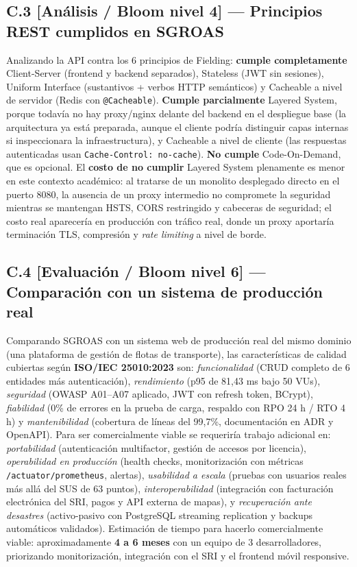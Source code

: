\subsection*{C.3 [Análisis / Bloom nivel 4] --- Principios REST cumplidos en SGROAS}

Analizando la API contra los 6 principios de Fielding: \textbf{cumple completamente} Client-Server (frontend y
backend separados), Stateless (JWT sin sesiones), Uniform Interface (sustantivos + verbos HTTP semánticos) y
Cacheable a nivel de servidor (Redis con \texttt{@Cacheable}). \textbf{Cumple parcialmente} Layered System, porque
todavía no hay proxy/nginx delante del backend en el despliegue base (la arquitectura ya está preparada, aunque el
cliente podría distinguir capas internas si inspeccionara la infraestructura), y Cacheable a nivel de cliente (las
respuestas autenticadas usan \texttt{Cache-Control: no-cache}). \textbf{No cumple} Code-On-Demand, que es opcional.
El \textbf{costo de no cumplir} Layered System plenamente es menor en este contexto académico: al tratarse de un
monolito desplegado directo en el puerto 8080, la ausencia de un proxy intermedio no compromete la seguridad
mientras se mantengan HSTS, CORS restringido y cabeceras de seguridad; el costo real aparecería en producción con
tráfico real, donde un proxy aportaría terminación TLS, compresión y \textit{rate limiting} a nivel de borde.

\subsection*{C.4 [Evaluación / Bloom nivel 6] --- Comparación con un sistema de producción real}

Comparando SGROAS con un sistema web de producción real del mismo dominio (una plataforma de gestión de flotas de
transporte), las características de calidad cubiertas según \textbf{ISO/IEC 25010:2023} son: \textit{funcionalidad}
(CRUD completo de 6 entidades más autenticación), \textit{rendimiento} (p95 de 81,43 ms bajo 50 VUs),
\textit{seguridad} (OWASP A01--A07 aplicado, JWT con refresh token, BCrypt), \textit{fiabilidad} (0\% de errores en
la prueba de carga, respaldo con RPO 24 h / RTO 4 h) y \textit{mantenibilidad} (cobertura de líneas del 99,7\%,
documentación en ADR y OpenAPI). Para ser comercialmente viable se requeriría trabajo adicional en:
\textit{portabilidad} (autenticación multifactor, gestión de accesos por licencia), \textit{operabilidad en
producción} (health checks, monitorización con métricas \texttt{/actuator/prometheus}, alertas), \textit{usabilidad
a escala} (pruebas con usuarios reales más allá del SUS de 63 puntos), \textit{interoperabilidad} (integración con
facturación electrónica del SRI, pagos y API externa de mapas), y \textit{recuperación ante desastres} (activo-pasivo
con PostgreSQL streaming replication y backups automáticos validados). Estimación de tiempo para hacerlo
comercialmente viable: aproximadamente \textbf{4 a 6 meses} con un equipo de 3 desarrolladores, priorizando
monitorización, integración con el SRI y el frontend móvil responsive.